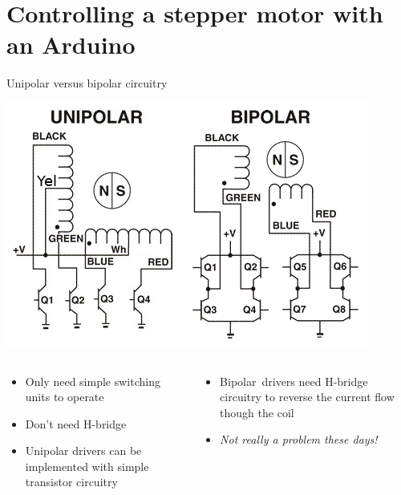 \documentclass[compress]{beamer}
\begin{document}
\section[Arduino]{Controlling a stepper motor with an Arduino}

\begin{frame}{Unipolar versus bipolar circuitry}

    \begin{center}
        \includegraphics[width=0.6\linewidth]{wiring}
    \end{center}

    \small
    \begin{columns}
        \begin{column}{0.6\linewidth}
            \begin{itemize}
                \item Only need simple switching units to operate
                \item Don’t need H-bridge
                \item Unipolar drivers can be implemented with simple transistor circuitry
            \end{itemize}
        \end{column}
        \begin{column}{0.5\linewidth}
            \begin{itemize}
                \item Bipolar drivers need H-bridge circuitry to reverse the current flow though the coil
                \item \emph{Not really a problem these days!}
            \end{itemize}
        \end{column}
    \end{columns}
\end{frame}
\end{document}
